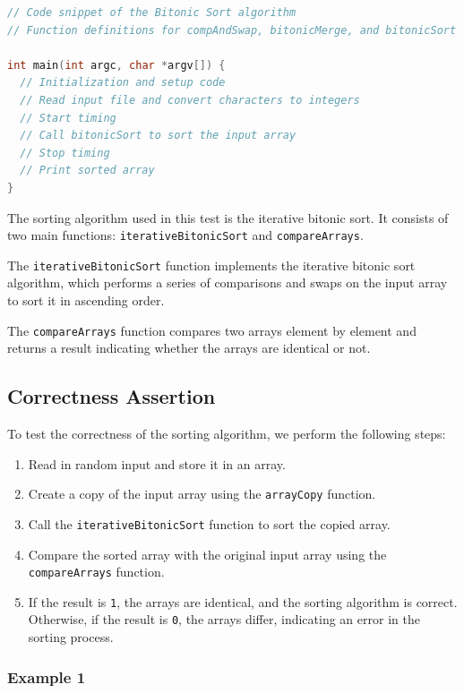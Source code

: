 \begin{lstlisting}[language=C, caption={Bitonic Sort Algorithm}, label={lst:bitonic_sort}]
// Code snippet of the Bitonic Sort algorithm
// Function definitions for compAndSwap, bitonicMerge, and bitonicSort

int main(int argc, char *argv[]) {
  // Initialization and setup code
  // Read input file and convert characters to integers
  // Start timing
  // Call bitonicSort to sort the input array
  // Stop timing
  // Print sorted array
}
\end{lstlisting}

The sorting algorithm used in this test is the iterative bitonic sort. It consists of two main functions: \texttt{iterativeBitonicSort} and \texttt{compareArrays}.

The \texttt{iterativeBitonicSort} function implements the iterative bitonic sort algorithm, which performs a series of comparisons and swaps on the input array to sort it in ascending order.

The \texttt{compareArrays} function compares two arrays element by element and returns a result indicating whether the arrays are identical or not.

\subsection*{Correctness Assertion}

To test the correctness of the sorting algorithm, we perform the following steps:

\begin{enumerate}
  \item Read in random input and store it in an array.
  \item Create a copy of the input array using the \texttt{arrayCopy} function.
  \item Call the \texttt{iterativeBitonicSort} function to sort the copied array.
  \item Compare the sorted array with the original input array using the \texttt{compareArrays} function.
  \item If the result is \texttt{1}, the arrays are identical, and the sorting algorithm is correct. Otherwise, if the result is \texttt{0}, the arrays differ, indicating an error in the sorting process.
\end{enumerate}

\subsubsection*{Example 1}


